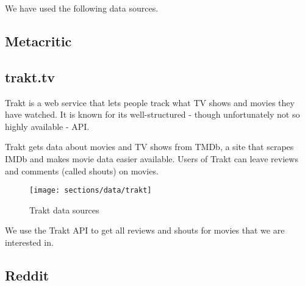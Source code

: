 We have used the following data sources.

\subsection{Metacritic}
\label{sec:data:metacritic}

\subsection{trakt.tv}
\label{sec:data:trakt}
Trakt is a web service that lets people track what TV shows and movies they have watched.
It is known for its well-structured - though unfortunately not so highly available - API.

Trakt gets data about movies and TV shows from TMDb, a site that scrapes IMDb and makes movie data easier available.
Users of Trakt can leave reviews and comments (called shouts) on movies.

\begin{figure}[H]
	\centering
	\texttt{[image: sections/data/trakt]}
	\caption{Trakt data sources}
\end{figure}

We use the Trakt API to get all reviews and shouts for movies that we are interested in.

\subsection{Reddit}
\label{sec:data:reddit}
